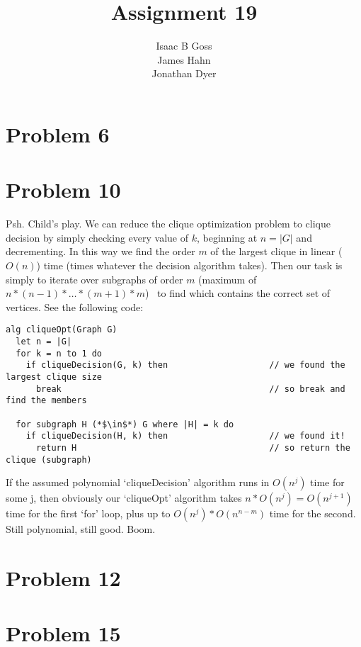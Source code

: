 \documentclass{article}
\author{Isaac B Goss\\ James Hahn\\ Jonathan Dyer}
\title{Assignment 19}
\providecommand{\prob}[1]{\section*{Problem #1}}
\begin{document}
\maketitle
\prob{6}




\prob{10}
Psh. Child's play.
We can reduce the clique optimization problem to clique decision by simply checking every value of $k$, 
beginning at $n = |G|$ and decrementing. 
In this way we find the order $m$ of the largest clique in linear ($O(n)$) time (times whatever the decision algorithm takes). 
Then our task is simply to iterate over subgraphs of order $m$ (maximum of $n*(n-1)*\dots*(m+1)*m$) \
to find which contains the correct set of vertices. See the following code:
\begin{lstlisting}
alg cliqueOpt(Graph G)
  let n = |G|
  for k = n to 1 do
    if cliqueDecision(G, k) then                    // we found the largest clique size
      break                                         // so break and find the members

  for subgraph H (*$\in$*) G where |H| = k do
    if cliqueDecision(H, k) then                    // we found it!
      return H                                      // so return the clique (subgraph)
\end{lstlisting}
If the assumed polynomial `cliqueDecision' algorithm runs in $O(n^j)$ time for some j, 
then obviously our `cliqueOpt' algorithm takes $n*O(n^j) = O(n^{j+1})$ time for the first `for' loop, 
plus up to $O(n^j) * O(n^{n-m})$ time for the second. 
Still polynomial, still good. Boom.

\prob{12}



\prob{15}
\end{document}
